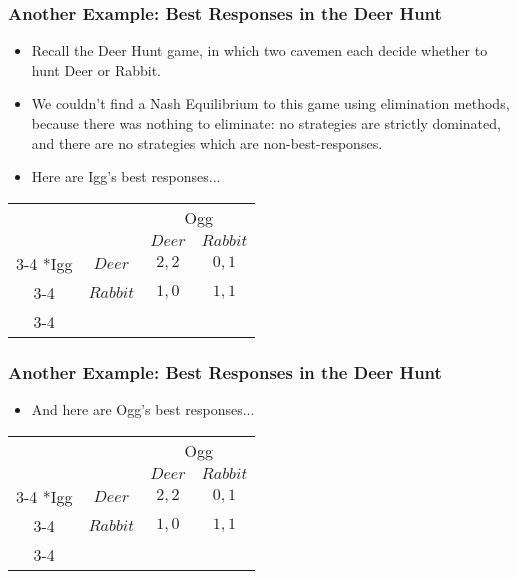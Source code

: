 \begin{frame}
\frametitle{Another Example: Best Responses in the Deer Hunt}
\begin{itemize}
	\item Recall the Deer Hunt game, in which two cavemen each decide whether to hunt Deer or Rabbit.
	\item We couldn't find a Nash Equilibrium to this game using elimination methods, because there was nothing to eliminate: no strategies are strictly dominated, and there are no strategies which are non-best-responses.
	\item Here are Igg's best responses...
\end{itemize}
\begin{table}[h]
\centering
\begin{tabular}{cc|c|c|}
	& \multicolumn{1}{c}{} & \multicolumn{2}{c}{Ogg}\\
	& \multicolumn{1}{c}{} & \multicolumn{1}{c}{$Deer$}  & \multicolumn{1}{c}{$Rabbit$} \\\cline{3-4}
	\multirow{2}*{Igg}  & $Deer$ & $2,2$ & $0,1$ \\\cline{3-4}
	& $Rabbit$ & $1,0$ & $1,1$ \\\cline{3-4}
\end{tabular}
\end{table}
\end{frame}

\begin{frame}
\frametitle{Another Example: Best Responses in the Deer Hunt}
\begin{itemize}
	\item And here are Ogg's best responses...
\end{itemize}
\begin{table}[h]
\centering
\begin{tabular}{cc|c|c|}
	& \multicolumn{1}{c}{} & \multicolumn{2}{c}{Ogg}\\
	& \multicolumn{1}{c}{} & \multicolumn{1}{c}{$Deer$}  & \multicolumn{1}{c}{$Rabbit$} \\\cline{3-4}
	\multirow{2}*{Igg}  & $Deer$ & $2,2$ & $0,1$ \\\cline{3-4}
	& $Rabbit$ & $1,0$ & $1,1$ \\\cline{3-4}
\end{tabular}
\end{table}
\end{frame}

